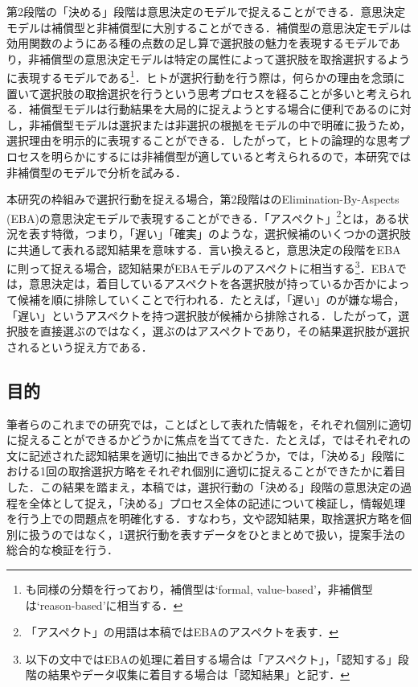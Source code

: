 \documentclass[japanese]{jnlp_1.3a}
\begin{document}
第2段階の「決める」段階は意思決定のモデルで捉えることができる．意思決定モデルは補償型と非補償型に大別することができる\cite{Payne1976}．補償型の意思決定モデルは効用関数のようにある種の点数の足し算で選択肢の魅力を表現するモデルであり，非補償型の意思決定モデルは特定の属性によって選択肢を取捨選択するように表現するモデルである\footnote{も同様の分類を行っており，補償型は`formal, value-based'，非補償型は`reason-based'に相当する．}．ヒトが選択行動を行う際は，何らかの理由を念頭に置いて選択肢の取捨選択を行うという思考プロセスを経ることが多いと考えられる．補償型モデルは行動結果を大局的に捉えようとする場合に便利であるのに対し，非補償型モデルは選択または非選択の根拠をモデルの中で明確に扱うため，選択理由を明示的に表現することができる．したがって，ヒトの論理的な思考プロセスを明らかにするには非補償型が適していると考えられるので，本研究では非補償型のモデルで分析を試みる．

本研究の枠組みで選択行動を捉える場合，第2段階はのElimination-By-Aspects (EBA)の意思決定モデルで表現することができる．「アスペクト」\footnote{「アスペクト」の用語は本稿ではEBAのアスペクトを表す．}とは，ある状況を表す特徴，つまり，「遅い」「確実」のような，選択候補のいくつかの選択肢に共通して表れる認知結果を意味する．言い換えると，意思決定の段階をEBAに則って捉える場合，認知結果がEBAモデルのアスペクトに相当する\footnote{以下の文中ではEBAの処理に着目する場合は「アスペクト」，「認知する」段階の結果やデータ収集に着目する場合は「認知結果」と記す．}．EBAでは，意思決定は，着目しているアスペクトを各選択肢が持っているか否かによって候補を順に排除していくことで行われる．たとえば，「遅い」のが嫌な場合，「遅い」というアスペクトを持つ選択肢が候補から排除される．したがって，選択肢を直接選ぶのではなく，選ぶのはアスペクトであり，その結果選択肢が選択されるという捉え方である．

\subsection{目的}
\label{subsec:mokuteki}

筆者らのこれまでの研究では，ことばとして表れた情報を，それぞれ個別に適切に捉えることができるかどうかに焦点を当ててきた．たとえば，ではそれぞれの文に記述された認知結果を適切に抽出できるかどうか，では，「決める」段階における1回の取捨選択方略をそれぞれ個別に適切に捉えることができたかに着目した．この結果を踏まえ，本稿では，選択行動の「決める」段階の意思決定の過程を全体として捉え，「決める」プロセス全体の記述について検証し，情報処理を行う上での問題点を明確化する．すなわち，文や認知結果，取捨選択方略を個別に扱うのではなく，1選択行動を表すデータをひとまとめで扱い，提案手法の総合的な検証を行う．
\end{document}
